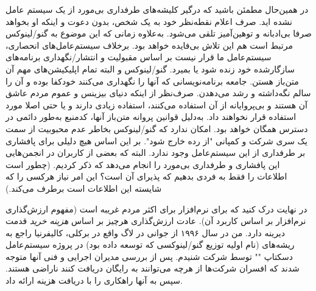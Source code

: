 در همین‌حال مطمئن باشید که درگیر کلیشه‌های طرفداری بی‌مورد از یک سیستم عامل نشده اید.
صرف اعلام نقطه‌نظر خود به یک شخص، بدون دعوت و اینکه او بخواهد صرفا بی‌ادبانه و توهین‌آمیز
تلقی می‌شود. به‌علاوه زمانی‌ که این موضوع به گنو/لینوکس مرتبط است هم این تلاش بی‌فایده خواهد بود.
برخلاف سیستم‌عامل‌های انحصاری، سیستم‌عامل ما قرار نیست بر اساس مقبولیت و انتشار/نگهداری
برنامه‌های سازگارشده خود زنده شود یا بمیرد.
گنو/لینوکس و البته تمام اپلیکیشن‌های مهم آن متن‌باز هستن. جامعه برنامه‌نویسانی که آنها
را نگهداری می‌کنند خودکفا بوده و آن را سالم نگه‌داشته و رشد می‌دهدن.
صرف‌نظر از اینکه دنیای بیزینس و عموم مردم عاشق آن هستند و بی‌پروایانه از آن استفاده می‌کنند،
استفاده زیادی دارند و یا حتی اصلا مورد استفاده قرار نخواهند داد.
به‌دلیل قوانین پروانه متن‌باز آنها، کدمنبع به‌طور دائمی در دسترس همگان خواهد بود.
امکان ندارد که گنو/لینوکس بخاطر عدم محبوبیت از سمت یک سری شرکت و کمپانی
"از رده خارج شود". بر این اساس هیچ دلیلی برای پافشاری بر طرفداری از این سیستم‌عامل
وجود ندارد. البته که بعضی از کاربران در انجمن‌هایی این پافشاری و طرفداری بی‌مورد را
انجام می‌دهد که ذکر کردیم. (چطور است اطلاعات را فقط به فردی بدهیم که پذیرای آن است؟
این امر نیاز هرکسی را که شایسته این اطلاعات است برطرف می‌کند.)

در نهایت درک کنید که
برای نرم‌افزار برای اکثر مردم غریبه است (مفهوم ارزش‌گذاری نرم‌افزار بر اساس کاربرد آن).
عادت ارزش‌گذاری هرچیز بر اساس
{\itshape هزینه خرید}
قدمت دیرینه دارد.
من در سال ۱۹۹۶ از جوانی در لاگ واقع در برکلی، کالیفرنیا راجع به ریشه‌های
(نام اولیه توزیع گنو/لینوکسی که توسعه داده بود) در پروژه
سیستم‌عامل دسکتاپ "" توسط شرکت  شنیدم.
پس از بررسی مدیران اجرایی و فنی آنها متوجه شدند که افسران شرکت‌ها
از هرچه می‌توانند به رایگان دریافت کنند ناراضی هستند. سپس 
به آنها راهکاری را با دریافت هزینه ارائه داد.


